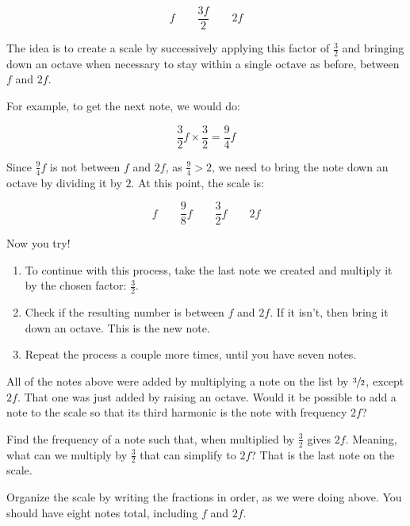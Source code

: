 \documentclass[12pt,noauthor,nooutcomes,hints,instructornotes]{ximera}%
\begin{document}
\[ f \qquad \frac{3f}{2} \qquad 2f
\]
    

The idea is to create a scale by successively applying this factor of $\frac{3}{2}$ and bringing down an octave when necessary to stay within a single octave as before, between $f$ and $2f$.

For example, to get the next note, we would do:



\[
\frac{3}{2}f\times\frac{3}{2}=\frac{9}{4}f
\]

Since $\frac{9}{4}f$ is not between $f$ and $2f$, as $\frac{9}{4}>2$, we need to bring the note down an octave by dividing it by $2$.  At this point, the scale is:

\[ f \qquad \frac{9}{8}f \qquad \frac{3}{2}f \qquad 2f
\]




\begin{question} Now you try! 
\begin{enumerate}
\item To continue with this process, take the last note we created and multiply it by the chosen factor: $\frac{3}{2}$.
    \item Check if the resulting number is between $f$ and $2f$. If it isn't, then bring it down an octave. This is the new note.
    \item Repeat the process a couple more times, until you have seven notes.
    \end{enumerate}
\end{question}    
    
 \begin{question}   All of the notes above were added by multiplying a note on the list by $\sfrac{3}{2}$, except $2f$. That one was just added by raising an octave. Would it be possible to add a note to the scale so that its third harmonic is the note with frequency $2f$?
    
Find the frequency of a note such that, when multiplied by $\frac{3}{2}$ gives $2f$. Meaning, what can we multiply by $\frac{3}{2}$ that can simplify to $2f$? That is the last note on the scale. 
\end{question}     
\begin{question}Organize the scale by writing the fractions in order, as we were doing above. You should have eight notes total, including $f$ and $2f$.
\end{question} 
    
\end{document}
